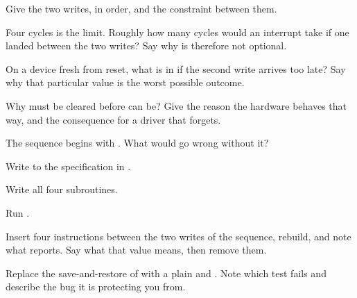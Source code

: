 \label{c6:ex:sequence}
\begin{parts}
  \item Give the two writes, in order, and the constraint between them.
  \item Four cycles is the limit. Roughly how many cycles would an interrupt take if one landed
    between the two writes? Say why  is therefore not optional.
  \item On a device fresh from reset, what is in  if the second write arrives too
    late? Say why that particular value is the worst possible outcome.
  \item Why must  be cleared before  can be? Give the reason the hardware
    behaves that way, and the consequence for a driver that forgets.
  \item The sequence begins with . What would go wrong without it?
\end{parts}

\label{c6:ex:driver}
Write  to the specification in .
\begin{parts}
  \item Write all four subroutines.
  \item Run .
  \item Insert four  instructions between the two writes of the sequence, rebuild, and
    note what  reports. Say what that value means, then
    remove them.
  \item Replace the save-and-restore of  with a plain  and . Note
    which test fails and describe the bug it is protecting you from.
\end{parts}

